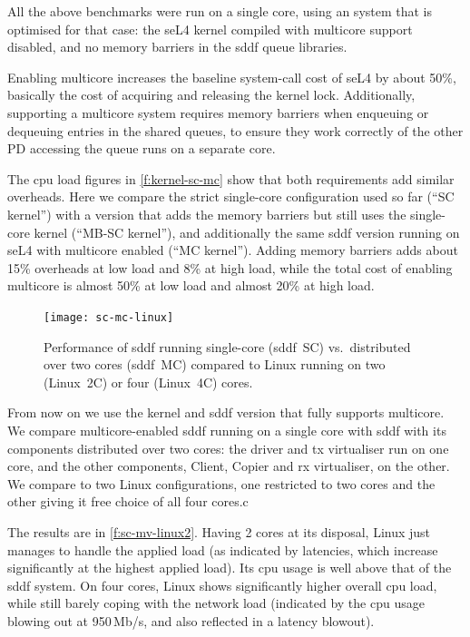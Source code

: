 \documentclass[a4paper,12pt]{report}
\begin{document}
All the above benchmarks were run on a single core, using an system
that is optimised for that case: the seL4 kernel compiled with
multicore support disabled, and no memory barriers in the \gls{sddf}
queue libraries.

Enabling multicore increases
the baseline system-call cost of seL4 by about 50\%, basically the
cost of acquiring and releasing the kernel lock. Additionally,
supporting a multicore system requires memory barriers when enqueuing
or dequeuing entries in the shared queues, to ensure they work
correctly of the other PD accessing the queue runs on a separate core.

The \gls{cpu} load figures in \autoref{f:kernel-sc-mc} show that both
requirements add similar overheads. Here we compare the strict
single-core configuration used so far (``SC kernel'') with a version
that adds the memory barriers but still uses the single-core kernel
(``MB-SC kernel''), and additionally the same \gls{sddf} version running on
seL4 with multicore enabled (``MC kernel''). Adding memory barriers
adds about 15\% overheads at low load and 8\% at high load, while the
total cost of enabling multicore is almost 50\% at low load and almost
20\% at high load.

\begin{figure}[t]
  \centering
  \texttt{[image: sc-mc-linux]}
  \caption[Single- and two-core \gls{sddf} performance compared to 2-core
  Linux.]{Performance of \gls{sddf} running single-core (\gls{sddf}~SC) vs.\ distributed over
    two cores (\gls{sddf}~MC) compared to Linux running on two (Linux~2C) or
    four (Linux~4C) cores.}
  \label{f:sc-mv-linux2}
\end{figure}

From now on we use the kernel and \gls{sddf} version that fully supports multicore.
We compare multicore-enabled \gls{sddf} running on a single core
with \gls{sddf} with its components distributed over two cores:
the driver and \gls{tx} virtualiser run on one core,
and the other components, Client, Copier and \gls{rx} virtualiser, on the other. We
compare to two Linux configurations, one restricted to two cores and
the other giving it free choice of all four cores.c

The results are in \autoref{f:sc-mv-linux2}.
Having 2 cores at its disposal, Linux just manages to handle the
applied load (as indicated by latencies, which increase significantly
at the highest applied load). Its \gls{cpu} usage is well above that of the
\gls{sddf} system. On four cores, Linux shows significantly higher overall
\gls{cpu} load, while still barely coping with the network load (indicated
by the \gls{cpu} usage blowing out at 950\,Mb/s, and also reflected in a
latency blowout).
\end{document}
